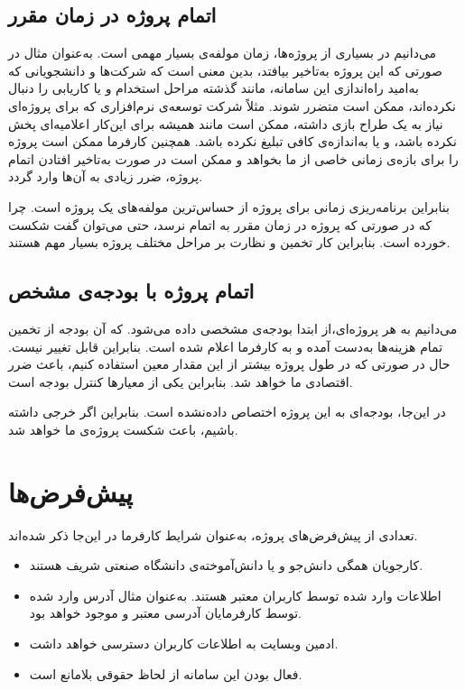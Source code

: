 \subsection{اتمام پروژه در زمان مقرر}
می‌دانیم در بسیاری از پروژه‌ها، زمان مولفه‌ی بسیار مهمی است. به‌عنوان مثال در صورتی که  این پروژه به‌تاخیر بیافتد، بدین معنی است که شرکت‌ها و دانشجویانی که به‌امید راه‌اندازی این سامانه، مانند گذشته مراحل استخدام و یا کاریابی را دنبال نکرده‌اند، ممکن است متضرر شوند. مثلاً شرکت توسعه‌ی نرم‌افزاری که برای پروژه‌ای نیاز به یک طراح بازی داشته، ممکن است مانند همیشه برای این‌کار اعلامیه‌ای پخش نکرده باشد، و یا به‌اندازه‌ی کافی تبلیغ نکرده باشد. همچنین کارفرما ممکن است پروژه را برای بازه‌ی زمانی خاصی از ما بخواهد و ممکن است در صورت به‌تاخیر افتادن اتمام پروژه، ضرر زیادی به آن‌ها وارد گردد. 

بنابراین برنامه‌ریزی زمانی برای پروژه از حساس‌ترین مولفه‌های یک پروژه است. چرا که در صورتی که پروژه در زمان مقرر به اتمام نرسد، حتی می‌توان گفت شکست خورده است. بنابراین کار تخمین و نظارت بر مراحل مختلف پروژه بسیار مهم هستند. 

\subsection{اتمام پروژه با بودجه‌ی مشخص}
می‌دانیم به هر پروژه‌ای،از ابتدا بودجه‌ی مشخصی داده می‌شود. که آن بودجه از تخمین تمام هزینه‌ها به‌دست آمده و به کارفرما اعلام شده است. بنابراین قابل تغییر نیست. حال در صورتی که در طول پروژه بیشتر از این مقدار معین استفاده کنیم، باعث ضرر اقتصادی ما خواهد شد. بنابراین یکی از معیارها کنترل بودجه است. 

در این‌جا، بودجه‌ای به این پروژه اختصاص داده‌نشده است. بنابراین اگر خرجی داشته باشیم، باعث شکست پروژه‌ی ما خواهد شد. 

\section{پیش‌فرض‌ها}
تعدادی از پیش‌فرض‌های پروژه، به‌عنوان شرایط کارفرما در این‌جا ذکر شده‌اند. 
\begin{itemize}
	\item
	کارجویان همگی دانش‌جو و یا دانش‌آموخته‌ی دانشگاه صنعتی شریف هستند.
	\item
	اطلاعات وارد شده توسط کاربران معتبر هستند. به‌عنوان مثال آدرس وارد شده توسط کارفرمایان آدرسی معتبر و موجود خواهد بود. 
	\item 
	ادمین وبسایت به اطلاعات کاربران دسترسی خواهد داشت. 
	\item 
	فعال بودن این سامانه از لحاظ حقوقی بلامانع است.
\end{itemize}

